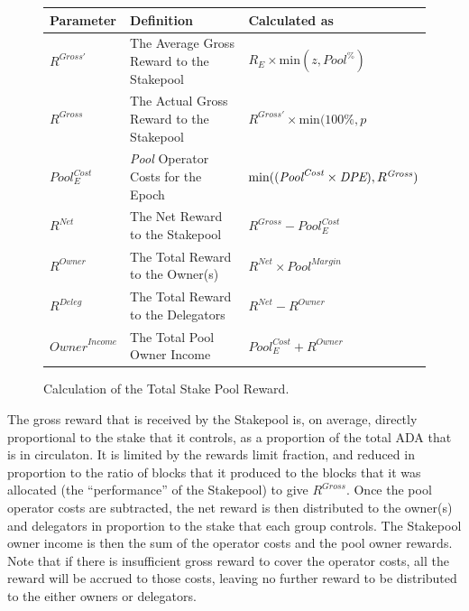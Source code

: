 \documentclass[11pt,a4paper,dvipsnames,twosided,final]{article}
\newcommand{\khcomment}[1]{\todo[color=blue!20]{KH: #1}}
\newcommand{\ada}{ADA{}}
\begin{document}
\clearpage
\begin{figure}[h!]
\begin{center}
\begin{tabular}{||l|p{7.8cm}|l||}
  \hline \hline
\textbf{Parameter}  & \textbf{Definition} & \textbf{Calculated as} \\\hline
$R^{Gross'}$ & The Average Gross Reward to the Stakepool & $R_E \times \textrm{min} (z,{\textit{Pool}}^\%)$ \\\hline
$R^{\textit{Gross}}$ & The Actual Gross Reward to the Stakepool & $R^{Gross'} \times \textrm{min} (100\%,p$ \\\hline
${\textit{Pool}}^{\textit{Cost}}_E$ & \textit{Pool} Operator Costs for the Epoch & $\textrm{min}((\textit{\textit{Pool}}^{\textit{Cost}} \times \textit{DPE}),R^{\textit{Gross}})$ \\\hline
$R^{\textit{Net}}$  & The Net Reward to the Stakepool & $R^{\textit{Gross}} - {\textit{Pool}}^{\textit{Cost}}_E$ \\\hline
$R^{Owner}$ & The Total Reward to the Owner(s) & $R^{\textit{Net}} \times {\textit{Pool}}^{\textit{Margin}} $ \\\hline
$R^{Deleg}$ & The Total Reward to the Delegators & $R^{\textit{Net}} - R^{Owner}$ \\\hline
$\textit{Owner}^\textit{Income}$ & The Total Pool Owner Income & ${\textit{Pool}}^{\textit{Cost}}_E + R^{Owner}$ \\\hline
\hline
\end{tabular}
\end{center}
\caption{Calculation of the Total Stake Pool Reward.}
\end{figure}

\noindent
The gross reward that is received by the Stakepool is, on average, directly proportional to the
stake that it controls, as a proportion of the total \ada{} that is in circulaton.
It is limited by the rewards limit fraction, and reduced in proportion to the ratio of blocks that it produced
to the blocks that it was allocated (the ``performance'' of the Stakepool) to give $R^{\textit{Gross}}$.
Once the pool operator costs are subtracted,
the net reward is then distributed to the owner(s) and delegators in proportion to the
stake that each group controls.  The Stakepool owner income is then the sum of the operator costs and the pool owner rewards.
Note that if there is insufficient gross reward to cover the operator costs, all the reward will be accrued to those
costs, leaving no further reward to be distributed to the either owners or delegators.
\end{document}
